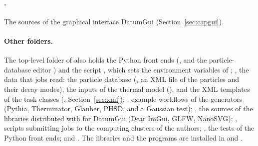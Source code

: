 \paragraph{.}
The sources of the graphical interface DatumGui (Section~\ref{sec:capgui}).

\paragraph{Other folders.}

The top-level folder of \Datum{} also holds the Python front ends (,  and the particle-database editor ) and the script , which sets the environment
variables of \Datum{}; , the data that jobs read: the particle database (, an XML file
of the particles and their decay modes), the inputs of the thermal model (), and the XML
templates of the task classes (, Section~\ref{sec:xml}); , example workflows of
the generators (Pythia, Therminator, Glauber, PHSD, and a Gaussian test); , the sources of the
libraries distributed with \Datum{} for DatumGui (Dear ImGui, GLFW, NanoSVG); , scripts submitting jobs to
the computing clusters of the authors; , the tests of the Python front ends; and .
The libraries and the programs are installed in  and .

